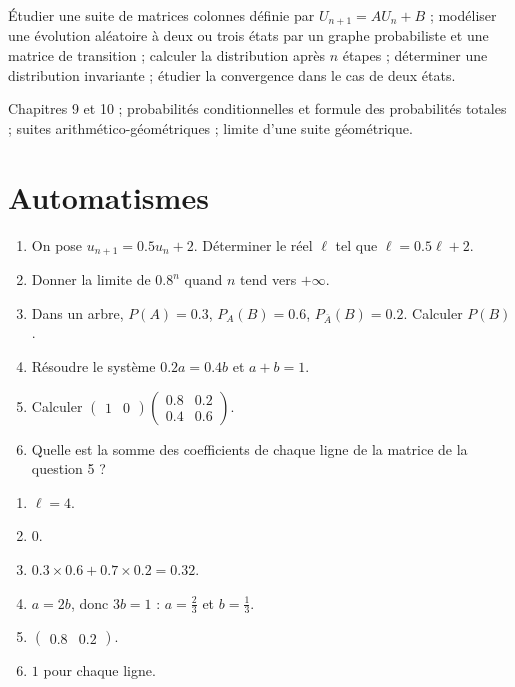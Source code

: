 
\begin{objectives}
Étudier une suite de matrices colonnes définie par $U_{n+1}=AU_n+B$ ; modéliser une évolution aléatoire à deux ou trois états par un graphe probabiliste et une matrice de transition ; calculer la distribution après $n$ étapes ; déterminer une distribution invariante ; étudier la convergence dans le cas de deux états.
\end{objectives}
\begin{prerequisites}
Chapitres 9 et 10 ; probabilités conditionnelles et formule des probabilités totales ; suites arithmético-géométriques ; limite d'une suite géométrique.
\end{prerequisites}

\section{Automatismes}
\begin{fluency}
\begin{enumerate}
\item On pose $u_{n+1}=\num{0,5}u_n+2$. Déterminer le réel $\ell$ tel que $\ell=\num{0,5}\ell+2$.
\item Donner la limite de $\num{0,8}^n$ quand $n$ tend vers $+\infty$.
\item Dans un arbre, $P(A)=\num{0,3}$, $P_A(B)=\num{0,6}$, $P_{\overline A}(B)=\num{0,2}$. Calculer $P(B)$.
\item Résoudre le système $\num{0,2}a=\num{0,4}b$ et $a+b=1$.
\item Calculer $\begin{pmatrix}1&0\end{pmatrix}\begin{pmatrix}\num{0,8}&\num{0,2}\\\num{0,4}&\num{0,6}\end{pmatrix}$.
\item Quelle est la somme des coefficients de chaque ligne de la matrice de la question 5 ?
\end{enumerate}
\end{fluency}
\begin{solution}[Automatismes]
\begin{enumerate}
\item $\ell=4$.
\item $0$.
\item $\num{0,3}\times\num{0,6}+\num{0,7}\times\num{0,2}=\num{0,32}$.
\item $a=2b$, donc $3b=1$ : $a=\frac23$ et $b=\frac13$.
\item $\begin{pmatrix}\num{0,8}&\num{0,2}\end{pmatrix}$.
\item $1$ pour chaque ligne.
\end{enumerate}
\end{solution}

